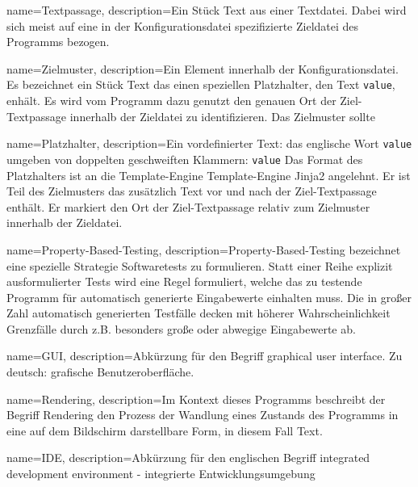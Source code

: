 \makeglossaries

{
    name=Textpassage,
    description={Ein Stück Text aus einer Textdatei. Dabei
            wird sich meist auf eine in der Konfigurationsdatei spezifizierte
            Zieldatei des Programms bezogen.}
}

{
    name=Zielmuster,
    description={Ein Element innerhalb der Konfigurationsdatei. Es bezeichnet ein
            Stück Text das einen speziellen \gls{Platzhalter}, den Text \texttt{{{value}}},
            enhält. Es wird vom Programm dazu genutzt den genauen Ort der Ziel-\gls{Textpassage}
            innerhalb der Zieldatei zu identifizieren. Das Zielmuster sollte}
}

{
    name=Platzhalter,
    description={Ein vordefinierter Text: das englische Wort \texttt{value}
            umgeben von doppelten geschweiften Klammern:
            \texttt{{{value}}} Das Format des Platzhalters ist an
            die Template-Engine Template-Engine Jinja2 \cite{jinja2} angelehnt.
            Er ist Teil des \gls{Zielmuster}s das zusätzlich Text vor und nach
            der Ziel-\gls{Textpassage} enthält. Er markiert den Ort der Ziel-\gls{Textpassage}
            relativ zum \gls{Zielmuster} innerhalb der Zieldatei.}
}

{
    name=Property-Based-Testing,
    description={Property-Based-Testing bezeichnet eine spezielle Strategie Softwaretests
            zu formulieren. Statt einer Reihe explizit ausformulierter Tests wird eine Regel
            formuliert, welche das zu testende Programm für automatisch generierte Eingabewerte
            einhalten muss. Die in großer Zahl automatisch generierten Testfälle
            decken mit höherer Wahrscheinlichkeit Grenzfälle durch z.B. besonders
            große oder abwegige Eingabewerte ab.}
}

{
    name=GUI,
    description={Abkürzung für den Begriff graphical user interface. Zu deutsch:
            grafische Benutzeroberfläche.}
}

{
    name=Rendering,
    description={Im Kontext dieses Programms beschreibt der Begriff Rendering den
            Prozess der Wandlung eines Zustands des Programms in eine auf dem Bildschirm
            darstellbare Form, in diesem Fall Text.}
}

{
    name=IDE,
    description={Abkürzung für den englischen Begriff integrated development
            environment - integrierte Entwicklungsumgebung}
}

\glsaddall